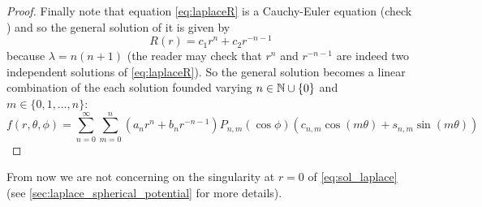 \documentclass[../main.tex]{subfiles}
\begin{document}
\begin{proof}
  Finally note that equation \cref{eq:laplaceR} is a Cauchy-Euler equation (check \cite{wiki:cauchy-euler}) and so the general solution of it is given by
  \begin{equation}
    R(r) = c_1 r^{n} + c_2 r^{-n-1}
  \end{equation}
  because $\lambda = n(n+1)$ (the reader may check that $r^n$ and $r^{-n-1}$ are indeed two independent solutions of \cref{eq:laplaceR}). So the general solution becomes a linear combination of the each solution founded varying $n\in\mathbb{N}\cup\{0\}$ and $m\in\{0,1,\dots,n\}$:
  \begin{equation}
    f(r,\theta,\phi) = \sum_{n=0}^\infty \sum_{m=0}^n (a_n r^{n} +b_{n}r^{-n-1})P_{n,m}(\cos\phi) (c_{n,m}\cos(m\theta)+s_{n,m}\sin(m\theta))
  \end{equation}
\end{proof}
From now we are not concerning on the singularity at $r=0$ of \cref{eq:sol_laplace} (see \cref{sec:laplace_spherical_potential} for more details).
\end{document}
